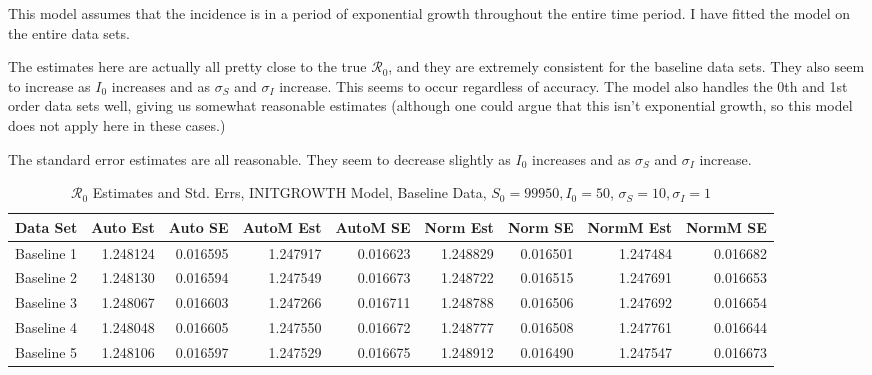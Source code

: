 \documentclass[12pt]{article}
\newcommand{\rr}{\ensuremath{\mathcal{R}_0}}
\begin{document}
This model assumes that the incidence is in a period of exponential growth throughout the entire time period. I have fitted the model on the entire data sets.

The estimates here are actually all pretty close to the true $\rr$, and they are extremely consistent for the baseline data sets. They also seem to increase as $I_0$ increases and as $\sigma_S$ and $\sigma_I$ increase. This seems to occur regardless of accuracy. The model also handles the 0th and 1st order data sets well, giving us somewhat reasonable estimates (although one could argue that this isn't exponential growth, so this model does not apply here in these cases.)

The standard error estimates are all reasonable. They seem to decrease slightly as $I_0$ increases and as $\sigma_S$ and $\sigma_I$ increase.

\begin{table}[H]
	
	\caption{$\rr$ Estimates and Std. Errs, INITGROWTH Model, 
		Baseline Data, $S_0 = 99950, I_0 = 50$, 
		$\sigma_S = 10, \sigma_I = 1$}
	\begin{footnotesize}
		\hskip -1cm
	\begin{tabular}{l|r|r|r|r|r|r|r|r}
		\hline
		Data Set & Auto Est & Auto SE & AutoM Est & AutoM SE & Norm Est & Norm SE & NormM Est & NormM SE\\
		\hline
		Baseline 1 & 1.248124 & 0.016595 & 1.247917 & 0.016623 & 1.248829 & 0.016501 & 1.247484 & 0.016682\\
		\hline
		Baseline 2 & 1.248130 & 0.016594 & 1.247549 & 0.016673 & 1.248722 & 0.016515 & 1.247691 & 0.016653\\
		\hline
		Baseline 3 & 1.248067 & 0.016603 & 1.247266 & 0.016711 & 1.248788 & 0.016506 & 1.247692 & 0.016654\\
		\hline
		Baseline 4 & 1.248048 & 0.016605 & 1.247550 & 0.016672 & 1.248777 & 0.016508 & 1.247761 & 0.016644\\
		\hline
		Baseline 5 & 1.248106 & 0.016597 & 1.247529 & 0.016675 & 1.248912 & 0.016490 & 1.247547 & 0.016673\\
		\hline
	\end{tabular}
\end{footnotesize}
\end{table}
\end{document}
